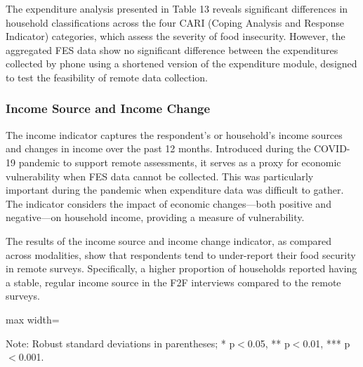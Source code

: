 \documentclass[11pt,harvard]{article}
\begin{document}
	The expenditure analysis presented in Table 13 reveals significant differences in household classifications across the four CARI (Coping Analysis and Response Indicator) categories, which assess the severity of food insecurity. However, the aggregated FES data show no significant difference between the expenditures collected by phone using a shortened version of the expenditure module, designed to test the feasibility of remote data collection.
	
	\subsubsection{Income Source and Income Change}
	The income indicator captures the respondent's or household's income sources and changes in income over the past 12 months. Introduced during the COVID-19 pandemic to support remote assessments, it serves as a proxy for economic vulnerability when FES data cannot be collected. This was particularly important during the pandemic when expenditure data was difficult to gather. The indicator considers the impact of economic changes—both positive and negative—on household income, providing a measure of vulnerability.

	The results of the income source and income change indicator, as compared across modalities, show that respondents tend to under-report their food security in remote surveys. Specifically, a higher proportion of households reported having a stable, regular income source in the F2F interviews compared to the remote surveys. 
	
	\begin{table}[htbp]
		\centering
		\begin{adjustbox}{max width=\textwidth}
			\begin{threeparttable}
				\caption{Impact of Survey Modality on Income}
				\footnotesize
				 
				\label{tab:INC_Modality_BF}
				\begin{tablenotes}
					\item Note: Robust standard deviations in parentheses; * p$<$0.05, ** p$<$0.01, *** p$<$0.001.
				\end{tablenotes}
			\end{threeparttable}
		\end{adjustbox}
	\end{table}
	
	
	
	
	

	\pagebreak
	
\end{document}
